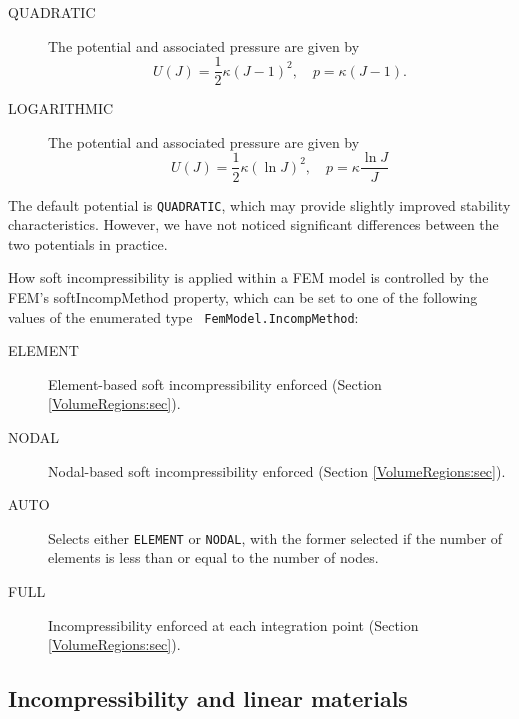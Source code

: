 \begin{description}

\item[QUADRATIC] The potential and associated pressure
are given by
%
\begin{equation}
U(J) = \frac{1}{2}\kappa (J - 1)^2, \quad p = \kappa (J - 1).
\end{equation}
%

\item[LOGARITHMIC]
The potential and associated pressure
are given by
%
\begin{equation}
U(J) = \frac{1}{2}\kappa (\ln J)^2, \quad p = \kappa \frac{\ln J}{J}
\end{equation}
%

\end{description}

The default potential is {\tt QUADRATIC}, which may provide slightly
improved stability characteristics.  However, we have not noticed
significant differences between the two potentials in practice.

How soft incompressibility is applied within a FEM model is controlled
by the FEM's {\sf softIncompMethod} property, which can be set to one
of the following values of the enumerated type {\tt
FemModel.IncompMethod}:

\begin{description}

\item[ELEMENT] Element-based soft incompressibility enforced
(Section \ref{VolumeRegions:sec}).

\item[NODAL] Nodal-based soft incompressibility enforced
(Section \ref{VolumeRegions:sec}).

\item[AUTO] Selects either {\tt ELEMENT} or {\tt NODAL},
with the former selected if the number of elements is less than or
equal to the number of nodes.

\item[FULL] Incompressibility enforced at each integration point
(Section \ref{VolumeRegions:sec}).

\end{description}

\subsection{Incompressibility and linear materials}
\label{IncompLinearMaterials:sec}

